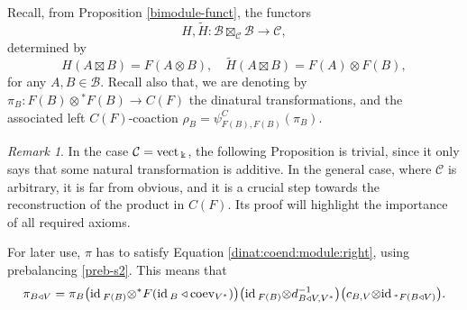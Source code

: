 \documentclass[11pt]{amsart}
\newcommand{\coev}{\mbox{coev}}
\newcommand{\ca}{{\mathcal C}}
\newcommand{\ot}{{\otimes}}
\newcommand{\Bc}{{\mathcal B}}
\newcommand{\ku}{{\Bbbk}}
\newcommand{\id}{\mbox{\rm id\,}}
\newcommand{\vect}{\mbox{\rm vect\,}}
\renewcommand{\_}[1]{\mbox{$_{\left( #1 \right)}$}}
\theoremstyle{plain}
\numberwithin{equation}{section}
\theoremstyle{definition}
\theoremstyle{remark}
\newtheorem{rmk}[teo]{Remark}
\theoremstyle{introTheorems}
\begin{document}
Recall, from Proposition \ref{bimodule-funct}, the functors
$$H, \widetilde{H}:\Bc\boxtimes_\ca \Bc\to \ca,$$
determined by
$$H(A\boxtimes B)=F(A\ot B), \quad \widetilde{H}(A\boxtimes B)=F(A)\ot F(B),$$
for any $A, B\in \Bc$. Recall also that, we are denoting by $\pi_B:F(B)\ot {}^*F(B)\to C(F)$ the dinatural transformations, and the associated left $C(F)$-coaction
$\rho_B=\psi^C_{F(B),F(B)}(\pi_B).$

\medbreak


\begin{rmk}  In the case $\ca=\vect_\ku$, the following Proposition is trivial, since it only says that some natural transformation is additive. In the general case, where $\ca$ is arbitrary, it is far from obvious, and it is a  crucial step towards the  reconstruction of the product in $C(F)$. Its proof will highlight the importance of all required axioms.
\end{rmk}

For later use, $\pi$ has to satisfy Equation \eqref{dinat:coend:module:right}, using prebalancing \eqref{preb-s2}. This means that
\begin{equation}\label{pi-cf} \pi_{B\triangleleft V}=\pi_B \big(\id_{F(B)}\ot {}^*F(\id_B \triangleleft \coev_{V^*}) \big)\big(\id_{F(B)}\ot d^{-1}_{B\triangleleft V,V^* }\big)\big(c_{B, V}\ot \id_{{}^*F(B\triangleleft V)}\big).
\end{equation}
\end{document}
